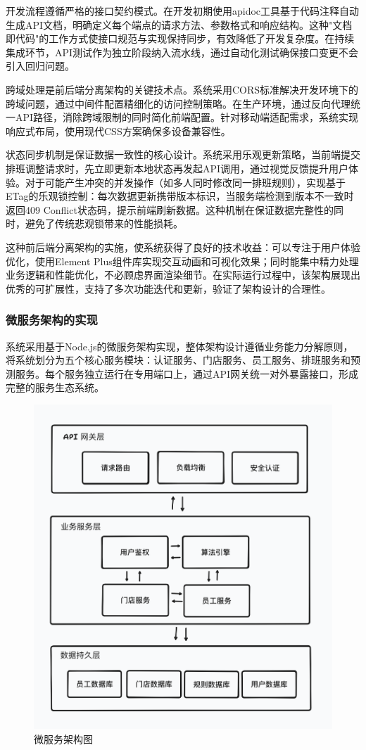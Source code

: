 \documentclass{ctexart}
\begin{document}
开发流程遵循严格的接口契约模式。在开发初期使用apidoc工具基于代码注释自动生成API文档，明确定义每个端点的请求方法、参数格式和响应结构。这种"文档即代码"的工作方式使接口规范与实现保持同步，有效降低了开发复杂度。在持续集成环节，API测试作为独立阶段纳入流水线，通过自动化测试确保接口变更不会引入回归问题。

跨域处理是前后端分离架构的关键技术点。系统采用CORS标准解决开发环境下的跨域问题，通过中间件配置精细化的访问控制策略。在生产环境，通过反向代理统一API路径，消除跨域限制的同时简化前端配置。针对移动端适配需求，系统实现响应式布局，使用现代CSS方案确保多设备兼容性。

状态同步机制是保证数据一致性的核心设计。系统采用乐观更新策略，当前端提交排班调整请求时，先立即更新本地状态再发起API调用，通过视觉反馈提升用户体验。对于可能产生冲突的并发操作（如多人同时修改同一排班规则），实现基于ETag的乐观锁控制：每次数据更新携带版本标识，当服务端检测到版本不一致时返回409 Conflict状态码，提示前端刷新数据。这种机制在保证数据完整性的同时，避免了传统悲观锁带来的性能损耗。

这种前后端分离架构的实施，使系统获得了良好的技术收益：可以专注于用户体验优化，使用Element Plus组件库实现交互动画和可视化效果；同时能集中精力处理业务逻辑和性能优化，不必顾虑界面渲染细节。在实际运行过程中，该架构展现出优秀的可扩展性，支持了多次功能迭代和更新，验证了架构设计的合理性。
\subsubsection{微服务架构的实现}
系统采用基于Node.js的微服务架构实现，整体架构设计遵循业务能力分解原则，将系统划分为五个核心服务模块：认证服务、门店服务、员工服务、排班服务和预测服务。每个服务独立运行在专用端口上，通过API网关统一对外暴露接口，形成完整的服务生态系统。

\begin{figure}[H]
    \centering
    \includegraphics[width=0.8\linewidth]{./source/微服务架构图.png}
    \caption{微服务架构图}
    \label{fig:microservice-arch}
\end{figure}
\end{document}

